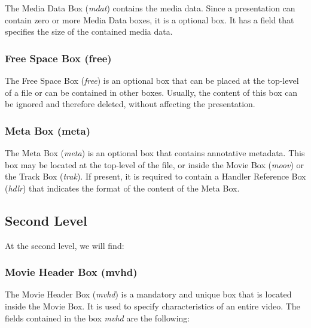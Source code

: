 The Media Data Box (\emph{mdat}) contains the media data. Since a presentation can contain zero or more Media Data boxes, it is a optional box. It has a field that specifies the size of the contained media data.

\subsubsection*{Free Space Box (free)}

The Free Space Box (\emph{free}) is an optional box that can be placed at the top-level of a file or can be contained in other boxes. Usually, the content of this box can be ignored and therefore deleted, without affecting the presentation.

\subsubsection*{Meta Box (meta)}

The Meta Box (\emph{meta}) is an optional box that contains annotative metadata. This box may be located at the top-level of the file, or inside the Movie Box (\emph{moov}) or the Track Box (\emph{trak}). If present, it is required to contain a Handler Reference Box (\emph{hdlr}) that indicates the format of the content of the Meta Box.

\subsection{Second Level}

At the second level, we will find:

\subsubsection*{Movie Header Box (mvhd)}

The Movie Header Box (\emph{mvhd}) is a mandatory and unique box that is located inside the Movie Box. It is used to specify characteristics of an entire video. The fields contained in the box \emph{mvhd} are the following:

